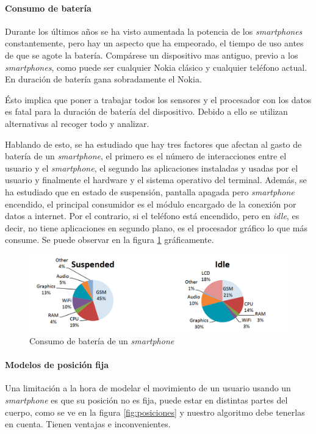 \documentclass[12pt]{book}
\numberwithin{equation}{section}
\begin{document}
\paragraph{Consumo de batería}
Durante los últimos años se ha visto aumentada la potencia de los \textit{smartphones} constantemente, pero hay un aspecto que ha empeorado, el tiempo de uso antes de que se agote la batería. Compárese un dispositivo mas antiguo, previo a los \textit{smartphones}, como puede ser cualquier Nokia clásico y cualquier teléfono actual. En duración de batería gana sobradamente el Nokia. 

Ésto implica que poner a trabajar todos los sensores y el procesador con los datos es fatal para la duración de batería del dispositivo. Debido a ello se utilizan alternativas al recoger todo y analizar. 

Hablando de esto, se ha estudiado que hay tres factores que afectan al gasto de batería de un \textit{smartphone}, el primero es el número de interacciones entre el usuario y el \textit{smartphone}, el segundo las aplicaciones instaladas y usadas por el usuario y finalmente el hardware y el sistema operativo del terminal\cite{Falaki:2010:DSU:1814433.1814453}. Además, se ha estudiado que en estado de suspensión, pantalla apagada pero \textit{smartphone} encendido, el principal consumidor es el módulo encargado de la conexión por datos a internet. Por el contrario, si el teléfono está encendido, pero en \textit{idle}, es decir, no tiene aplicaciones en segundo plano, es el procesador gráfico lo que más consume\cite{Carroll:2010:APC:1855840.1855861}. Se puede observar en la figura \ref{fig:consumo} gráficamente.
\begin{figure}[h]
    \centering
    \includegraphics[width=1\textwidth]{batterylife.png}
    \caption{Consumo de batería de un \textit{smartphone}\cite{Carroll:2010:APC:1855840.1855861}}
    \label{fig:consumo}
\end{figure}

\paragraph{Modelos de posición fija}
Una limitación a la hora de modelar el movimiento de un usuario usando un \textit{smartphone} es que su posición no es fija, puede estar en distintas partes del cuerpo, como se ve en la figura \ref{fig:posiciones} y nuestro algoritmo debe tenerlas en cuenta. Tienen ventajas e inconvenientes. 
\end{document}
